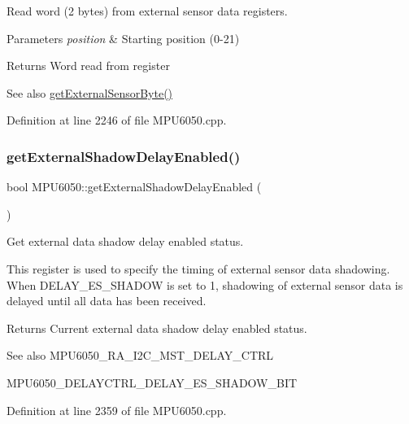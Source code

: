 Read word (2 bytes) from external sensor data registers. 


\begin{DoxyParams}{Parameters}
{\em position} & Starting position (0-\/21) \\
\hline
\end{DoxyParams}
\begin{DoxyReturn}{Returns}
Word read from register 
\end{DoxyReturn}
\begin{DoxySeeAlso}{See also}
\mbox{\hyperlink{classMPU6050_a7f786ab4264f40e5a95e8937ec9adcc2}{get\+External\+Sensor\+Byte()}} 
\end{DoxySeeAlso}


Definition at line 2246 of file M\+P\+U6050.\+cpp.

\mbox{\label{classMPU6050_a0e5cb13838298609b5260fd1558f8c92}} 
\subsubsection{\texorpdfstring{getExternalShadowDelayEnabled()}{getExternalShadowDelayEnabled()}}
{\footnotesize\ttfamily bool M\+P\+U6050\+::get\+External\+Shadow\+Delay\+Enabled (\begin{DoxyParamCaption}{ }\end{DoxyParamCaption})}



Get external data shadow delay enabled status. 

This register is used to specify the timing of external sensor data shadowing. When D\+E\+L\+A\+Y\+\_\+\+E\+S\+\_\+\+S\+H\+A\+D\+OW is set to 1, shadowing of external sensor data is delayed until all data has been received. \begin{DoxyReturn}{Returns}
Current external data shadow delay enabled status. 
\end{DoxyReturn}
\begin{DoxySeeAlso}{See also}
M\+P\+U6050\+\_\+\+R\+A\+\_\+\+I2\+C\+\_\+\+M\+S\+T\+\_\+\+D\+E\+L\+A\+Y\+\_\+\+C\+T\+RL 

M\+P\+U6050\+\_\+\+D\+E\+L\+A\+Y\+C\+T\+R\+L\+\_\+\+D\+E\+L\+A\+Y\+\_\+\+E\+S\+\_\+\+S\+H\+A\+D\+O\+W\+\_\+\+B\+IT 
\end{DoxySeeAlso}


Definition at line 2359 of file M\+P\+U6050.\+cpp.

